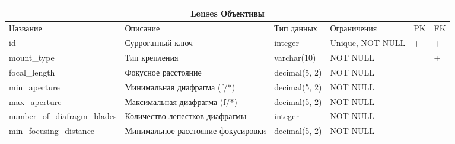\documentclass{article}
\begin{document}
\begin{tabular}{ |p{4.5cm}|p{4cm}|p{3cm}|p{3cm}|p{2cm}|p{1cm}| }
\hline
\multicolumn{6}{|c|}{Lenses Объективы} \\
\hline
Название & Описание & Тип данных & Ограничения & PK & FK\\
\hline
id                                  &   %
Суррогатный ключ                    &   %
integer                             &   %
Unique, NOT NULL                    &   %
 +                                  &   %
 +                                  \\  %
\hline
mount\_type                         &   %
Тип крепления                       &   %
varchar(10)                         &   %
NOT NULL                            &   %
                                    &   %
 +                                  \\  %
\hline
focal\_length                       &   %
Фокусное расстояние                 &   %
decimal(5, 2)                       &   %
NOT NULL                            &   %
                                    &   %
                                    \\  %
\hline
min\_aperture                       &   %
Минимальная диафрагма (f/*)         &   %
decimal(5, 2)                       &   %
NOT NULL                            &   %
                                    &   %
                                    \\  %
\hline
max\_aperture                       &   %
Максимальная диафрагма (f/*)        &   %
decimal(5, 2)                       &   %
NOT NULL                            &   %
                                    &   %
                                    \\  %
\hline
number\_of\_diafragm\_blades        &   %
Количество лепестков диафрагмы      &   %
integer                             &   %
NOT NULL                            &   %
                                    &   %
                                    \\  %
\hline
min\_focusing\_distance             &   %
Минимальное расстояние фокусировки  &   %
decimal(5, 2)                       &   %
NOT NULL                            &   %
                                    &   %

\end{tabular}
\end{document}
